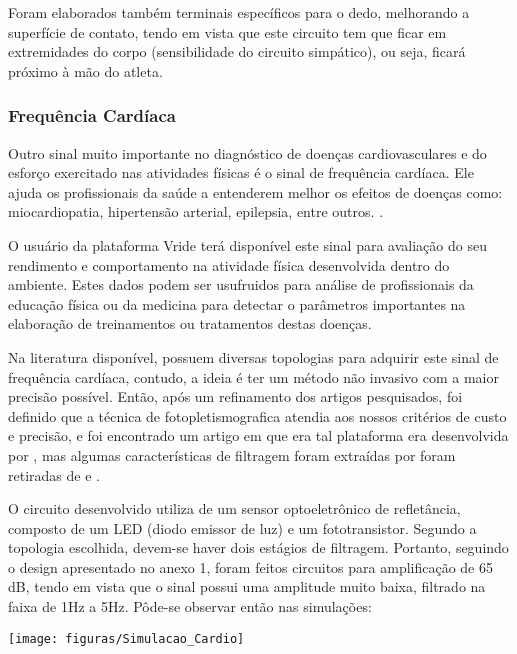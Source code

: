     Foram elaborados também terminais específicos para o dedo, melhorando a superfície de contato, tendo em vista que este circuito tem que ficar em extremidades do corpo (sensibilidade do circuito simpático), ou seja, ficará próximo à mão do atleta.


\subsubsection{Frequência Cardíaca}

Outro sinal muito importante no diagnóstico de doenças cardiovasculares e do esforço exercitado nas atividades físicas é o sinal de frequência cardíaca. Ele ajuda os profissionais da saúde a entenderem melhor os efeitos de doenças como: miocardiopatia, hipertensão arterial, epilepsia, entre outros. \cite{VANDERLEI2009} .

O usuário da plataforma Vride terá disponível este sinal para avaliação do seu rendimento e comportamento na atividade física desenvolvida dentro do ambiente. Estes dados podem ser usufruidos para análise de profissionais da educação física ou da medicina para detectar o parâmetros importantes na elaboração de treinamentos ou tratamentos destas doenças.

Na literatura disponível, possuem diversas topologias para adquirir este sinal de frequência cardíaca, contudo, a ideia é ter um método não invasivo com a maior precisão possível. Então, após um refinamento dos artigos pesquisados, foi definido que a técnica de fotopletismografica atendia aos nossos critérios de custo e precisão, e foi encontrado um artigo em que era tal plataforma era desenvolvida por \cite{langereis2010photoplethysmography},
mas algumas características de filtragem foram extraídas por foram retiradas de \cite{abhishek2015} e \cite{rheesokwoo2000} .

O circuito desenvolvido utiliza de um sensor optoeletrônico de refletância, composto de um LED (diodo emissor de luz) e um fototransistor. Segundo a topologia escolhida, devem-se haver dois estágios de filtragem. Portanto, seguindo o design apresentado no anexo 1, foram feitos circuitos para amplificação de 65 dB, tendo em vista que o sinal possui uma amplitude muito baixa, filtrado na faixa de 1Hz a 5Hz. Pôde-se observar então nas simulações:

    \begin{center}
    	\texttt{[image: figuras/Simulacao\_Cardio]}
        \label{cardio_sim}
    \end{center}

